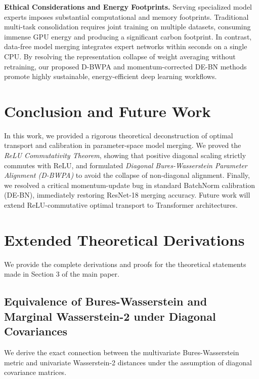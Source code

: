 \documentclass{article}
\theoremstyle{plain}
\theoremstyle{definition}
\theoremstyle{remark}
\begin{document}
\textbf{Ethical Considerations and Energy Footprints.}
Serving specialized model experts imposes substantial computational and memory footprints. Traditional multi-task consolidation requires joint training on multiple datasets, consuming immense GPU energy and producing a significant carbon footprint. In contrast, data-free model merging integrates expert networks within seconds on a single CPU. By resolving the representation collapse of weight averaging without retraining, our proposed D-BWPA and momentum-corrected DE-BN methods promote highly sustainable, energy-efficient deep learning workflows.

\section{Conclusion and Future Work}
In this work, we provided a rigorous theoretical deconstruction of optimal transport and calibration in parameter-space model merging. We proved the \emph{ReLU Commutativity Theorem}, showing that positive diagonal scaling strictly commutes with ReLU, and formulated \emph{Diagonal Bures-Wasserstein Parameter Alignment (D-BWPA)} to avoid the collapse of non-diagonal alignment. Finally, we resolved a critical momentum-update bug in standard BatchNorm calibration (DE-BN), immediately restoring ResNet-18 merging accuracy. Future work will extend ReLU-commutative optimal transport to Transformer architectures.

\clearpage



\clearpage
\appendix
\onecolumn
\section{Extended Theoretical Derivations}
\label{sec:appendix_theory}

We provide the complete derivations and proofs for the theoretical statements made in Section 3 of the main paper.

\subsection{Equivalence of Bures-Wasserstein and Marginal Wasserstein-2 under Diagonal Covariances}
We derive the exact connection between the multivariate Bures-Wasserstein metric and univariate Wasserstein-2 distances under the assumption of diagonal covariance matrices.
\end{document}
